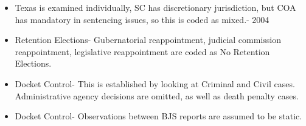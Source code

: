 \documentclass[12pt]{article}
\begin{document}
\begin{itemize}
	\item Texas is examined individually, SC has discretionary jurisdiction, but COA has mandatory in sentencing issues, so this is coded as mixed.- 2004
	
	\item Retention Elections- Gubernatorial reappointment, judicial commission reappointment, legislative reappointment are coded as No Retention Elections.
	
	\item Docket Control- This is established by looking at Criminal and Civil cases.  Administrative agency decisions are omitted, as well as death penalty cases.
	
	\item Docket Control- Observations between BJS reports are assumed to be static.
\end{itemize}
\end{document}
